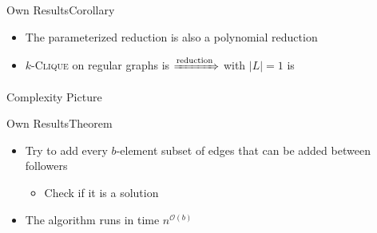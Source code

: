\begin{frame}{Own Results}{Corollary}
    \begin{center}
    \end{center}

    \begin{itemize}
        \item The parameterized reduction is also a polynomial reduction
        \item $k$-\textsc{Clique} on regular graphs is \NPh $\xRightarrow{\text{reduction}}$ \HLshort with $|L|=1$ is \NPh
    \end{itemize}
\end{frame}

\begin{frame}{\HLdeg Complexity Picture}
    
\end{frame}

\begin{frame}{Own Results}{Theorem}
    \begin{center}
    \end{center}

    \begin{itemize}
        \item Try to add every $b$-element subset of edges that can be added between followers
        \begin{itemize}
            \item Check if it is a solution
        \end{itemize}
        \item The algorithm runs in time $n^{\mathcal{O}(b)}$
    \end{itemize}
\end{frame}

